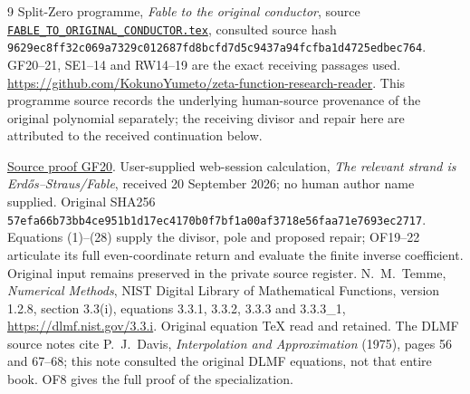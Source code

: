 \documentclass[11pt]{article}
\begin{document}
\begin{thebibliography}{9}
 Split-Zero programme, \emph{Fable to the original
conductor}, source \href{https://github.com/KokunoYumeto/zeta-function-research-reader/blob/5992ad50c0f2a06921f1fcaded7b4e38097c0739/workbenches/splitzero-tandem/continuations/20260920-original-kernel-mixed-determinants/providers/FABLE_TO_ORIGINAL_CONDUCTOR.tex\#L1}{\texttt{FABLE\_TO\_ORIGINAL\_CONDUCTOR.tex}},
consulted source hash
\nolinkurl{9629ec8ff32c069a7329c012687fd8bcfd7d5c9437a94fcfba1d4725edbec764}.
GF20--21, SE1--14 and RW14--19 are the exact receiving passages used.
\url{https://github.com/KokunoYumeto/zeta-function-research-reader}.
This programme source records the underlying human-source provenance
of the original polynomial separately; the receiving divisor and
repair here are attributed to the received continuation below.

\href{https://github.com/KokunoYumeto/zeta-function-research-reader/blob/5992ad50c0f2a06921f1fcaded7b4e38097c0739/workbenches/splitzero-tandem/continuations/20260920-original-kernel-mixed-determinants/providers/FABLE_TO_ORIGINAL_CONDUCTOR.tex\#L1598}{Source proof GF20}.
 User-supplied web-session calculation,
\emph{The relevant strand is Erd\H{o}s--Straus/Fable},
received 20 September 2026; no human author name supplied.
Original SHA256
\nolinkurl{57efa66b73bb4ce951b1d17ec4170b0f7bf1a00af3718e56faa71e7693ec2717}.
Equations (1)--(28) supply the divisor, pole and proposed repair;
OF19--22 articulate its full even-coordinate return and evaluate
the finite inverse coefficient. Original input remains preserved
in the private source register.
 N.~M.~Temme, \emph{Numerical Methods}, NIST Digital
Library of Mathematical Functions, version 1.2.8, section 3.3(i),
equations 3.3.1, 3.3.2, 3.3.3 and 3.3.3\_1,
\url{https://dlmf.nist.gov/3.3.i}.
Original equation TeX read and retained. The DLMF source notes cite
P.~J.~Davis, \emph{Interpolation and Approximation} (1975),
pages 56 and 67--68; this note consulted the original DLMF equations,
not that entire book. OF8 gives the full proof of the specialization.
\end{thebibliography}
\end{document}
